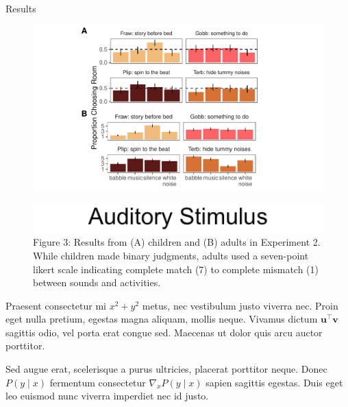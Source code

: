 \documentclass[final]{beamer}
\newlength{\colwidth}
\begin{document}
\begin{frame}[t]
\begin{columns}[t]
\begin{column}{\colwidth}
\begin{block}{Results}
    \begin{figure}
      \includegraphics[width = 10in]{../writeup/figs/figures4a4b_edits.pdf}
    \end{figure}

    \vspace{-0.3in}

    \begin{figure}
      \includegraphics[width = 5in]{../writeup/figs/aud_stimulus.png} \hspace{-1.5in}
      \caption{Figure 3: Results from (A) children and (B) adults in Experiment 2. While children made binary judgments, adults used a seven-point likert scale indicating complete match (7) to complete mismatch (1) between sounds and activities.}
    \end{figure}


    Praesent consectetur mi $x^2 + y^2$ metus, nec vestibulum justo viverra
    nec. Proin eget nulla pretium, egestas magna aliquam, mollis neque. Vivamus
    dictum $\mathbf{u}^\intercal\mathbf{v}$ sagittis odio, vel porta erat
    congue sed. Maecenas ut dolor quis arcu auctor porttitor.


    Sed augue erat, scelerisque a purus ultricies, placerat porttitor neque.
    Donec $P(y \mid x)$ fermentum consectetur $\nabla_x P(y \mid x)$ sapien
    sagittis egestas. Duis eget leo euismod nunc viverra imperdiet nec id
    justo.

  \end{block}


\end{column}
\end{columns}
\end{frame}
\end{document}
